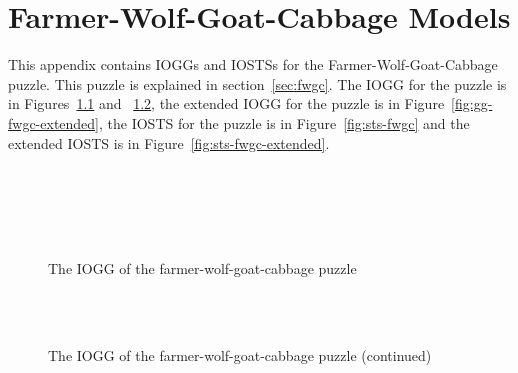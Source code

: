 \chapter{Farmer-Wolf-Goat-Cabbage Models}\label{app:fwgc}
This appendix contains IOGGs and IOSTSs for the Farmer-Wolf-Goat-Cabbage puzzle. This puzzle is explained in section~\ref{sec:fwgc}. The IOGG for the puzzle is in Figures~\ref{fig:gg-fwgc} and ~\ref{fig:gg-fwgc-continued}, the extended IOGG for the puzzle is in Figure~\ref{fig:gg-fwgc-extended}, the IOSTS for the puzzle is in Figure~\ref{fig:sts-fwgc} and the extended IOSTS is in Figure~\ref{fig:sts-fwgc-extended}. 

  \begin{figure}[ht]
  \begin{center}
    \hspace{20px}
    \subfloat[?n (priority 0)]{\label{fig:n-fwgc}} \\
    \hspace{20px}
     \\
    \hspace{20px}
     \\
    \hspace{20px}
     \\
  \end{center}
  \caption{The IOGG of the farmer-wolf-goat-cabbage puzzle}
  \label{fig:gg-fwgc}
  \end{figure}

  \begin{figure}[ht]
  \setcounter{subfigure}{8}
  \begin{center}
    \\
    \\
  \end{center}
  \caption{The IOGG of the farmer-wolf-goat-cabbage puzzle (continued)}
  \label{fig:gg-fwgc-continued}
  \end{figure}

